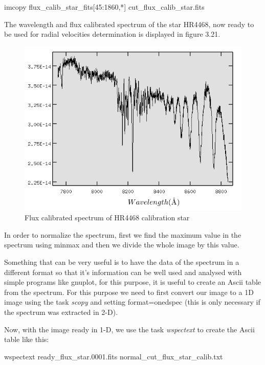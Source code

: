 \begin{center}
imcopy flux\_calib\_star\_fits[45:1860,*] cut\_flux\_calib\_star.fits
\end{center}

The wavelength and flux calibrated spectrum of the star HR4468, now ready to be used for radial velocities determination is displayed in figure 3.21.

\begin{figure}[H]
\centering
\includegraphics[width=12cm]{images/calib_star_flux.png}
\caption[Flux calibrated spectrum of HR4468]{Flux calibrated spectrum of HR4468 calibration star}
\end{figure}

In order to normalize the spectrum, first we find the maximum value in the spectrum using minmax and then we divide the whole image by this value. 

Something that can be very useful is to have the data of the spectrum in a different format so that it's information can be well used and analysed with simple programs like gnuplot, for this purpose, it is useful to create an Ascii table from the spectrum. For this purpose we need to first convert our image to a 1D image using the task \textit{scopy} and setting format=onedspec (this is only necessary if the spectrum was extracted in 2-D).

Now, with the image ready in 1-D, we use the task \textit{wspectext} to create the Ascii table like this:

\begin{center}
wspectext ready\_flux\_star.0001.fits normal\_cut\_flux\_star\_calib.txt
\end{center}

